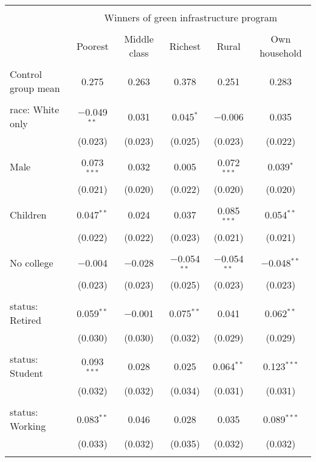 
\begin{tabular}{@{\extracolsep{5pt}}lccccc} 
\\[-1.8ex]\hline 
\hline \\[-1.8ex] 
 & \multicolumn{5}{c}{Winners of green infrastructure program} \\ 
\cline{2-6} 
\\[-1.8ex] & Poorest & Middle class & Richest & Rural & Own household \\ 
\hline \\[-1.8ex] 
 Control group mean & 0.275 & 0.263 & 0.378 & 0.251 & 0.283  \\ \hline \\[-1.8ex] race: White only & $-$0.049$^{**}$ & 0.031 & 0.045$^{*}$ & $-$0.006 & 0.035 \\ 
  & (0.023) & (0.023) & (0.025) & (0.023) & (0.022) \\ 
  & & & & & \\ 
 Male & 0.073$^{***}$ & 0.032 & 0.005 & 0.072$^{***}$ & 0.039$^{*}$ \\ 
  & (0.021) & (0.020) & (0.022) & (0.020) & (0.020) \\ 
  & & & & & \\ 
 Children & 0.047$^{**}$ & 0.024 & 0.037 & 0.085$^{***}$ & 0.054$^{**}$ \\ 
  & (0.022) & (0.022) & (0.023) & (0.021) & (0.021) \\ 
  & & & & & \\ 
 No college & $-$0.004 & $-$0.028 & $-$0.054$^{**}$ & $-$0.054$^{**}$ & $-$0.048$^{**}$ \\ 
  & (0.023) & (0.023) & (0.025) & (0.023) & (0.023) \\ 
  & & & & & \\ 
 status: Retired & 0.059$^{**}$ & $-$0.001 & 0.075$^{**}$ & 0.041 & 0.062$^{**}$ \\ 
  & (0.030) & (0.030) & (0.032) & (0.029) & (0.029) \\ 
  & & & & & \\ 
 status: Student & 0.093$^{***}$ & 0.028 & 0.025 & 0.064$^{**}$ & 0.123$^{***}$ \\ 
  & (0.032) & (0.032) & (0.034) & (0.031) & (0.031) \\ 
  & & & & & \\ 
 status: Working & 0.083$^{**}$ & 0.046 & 0.028 & 0.035 & 0.089$^{***}$ \\ 
  & (0.033) & (0.032) & (0.035) & (0.032) & (0.032) \\ 
  & & & & & \\ 

\end{tabular}
